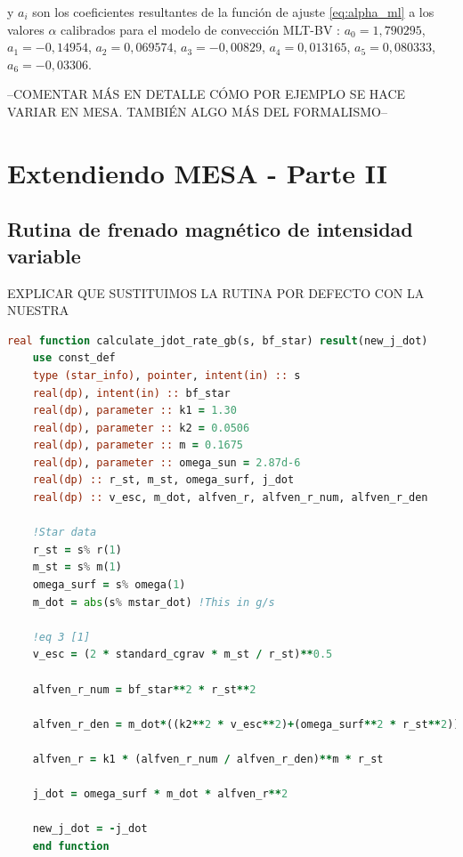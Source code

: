 y $a_i$ son los coeficientes resultantes de la función de ajuste \ref{eq:alpha_ml} a los valores $\alpha$ calibrados para el modelo de convección MLT-BV \cite{Sonoi2018}: $a_0=1,790295$, $a_1=-0,14954$, $a_2=0,069574$, $a_3=-0,00829$, $a_4=0,013165$, $a_5=0,080333$, $a_6=-0,03306$. \par
--COMENTAR MÁS EN DETALLE CÓMO POR EJEMPLO SE HACE VARIAR EN MESA. TAMBIÉN ALGO MÁS DEL FORMALISMO--



\section{Extendiendo MESA - Parte II}
\subsection{Rutina de frenado magnético de intensidad variable}
EXPLICAR QUE SUSTITUIMOS LA RUTINA POR DEFECTO CON LA NUESTRA
\begin{lstlisting}[language=Fortran, caption={Rutina de par de torsión.}, label={lst:jdot_gb}]
	real function calculate_jdot_rate_gb(s, bf_star) result(new_j_dot)
	use const_def
	type (star_info), pointer, intent(in) :: s
	real(dp), intent(in) :: bf_star
	real(dp), parameter :: k1 = 1.30
	real(dp), parameter :: k2 = 0.0506
	real(dp), parameter :: m = 0.1675
	real(dp), parameter :: omega_sun = 2.87d-6
	real(dp) :: r_st, m_st, omega_surf, j_dot
	real(dp) :: v_esc, m_dot, alfven_r, alfven_r_num, alfven_r_den
	
	!Star data
	r_st = s% r(1)
	m_st = s% m(1)
	omega_surf = s% omega(1)
	m_dot = abs(s% mstar_dot) !This in g/s
	
	!eq 3 [1]
	v_esc = (2 * standard_cgrav * m_st / r_st)**0.5
	
	alfven_r_num = bf_star**2 * r_st**2
	
	alfven_r_den = m_dot*((k2**2 * v_esc**2)+(omega_surf**2 * r_st**2))**0.5
	
	alfven_r = k1 * (alfven_r_num / alfven_r_den)**m * r_st
	
	j_dot = omega_surf * m_dot * alfven_r**2
	
	new_j_dot = -j_dot
	end function
	
\end{lstlisting}

